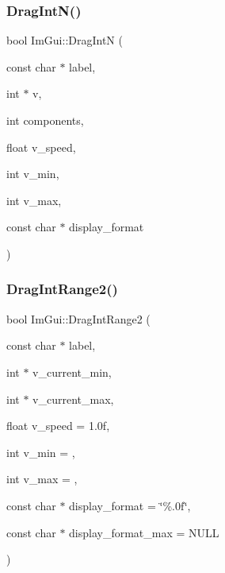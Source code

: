 \hypertarget{namespace_im_gui_a2854d672b818938e6e9fb1de6de3dbe7}{}\label{namespace_im_gui_a2854d672b818938e6e9fb1de6de3dbe7} 
\subsubsection{\texorpdfstring{Drag\+Int\+N()}{DragIntN()}}
{\footnotesize\ttfamily bool Im\+Gui\+::\+Drag\+IntN (\begin{DoxyParamCaption}\item[{const char $\ast$}]{label,  }\item[{int $\ast$}]{v,  }\item[{int}]{components,  }\item[{float}]{v\+\_\+speed,  }\item[{int}]{v\+\_\+min,  }\item[{int}]{v\+\_\+max,  }\item[{const char $\ast$}]{display\+\_\+format }\end{DoxyParamCaption})}

\hypertarget{namespace_im_gui_a6aaacf92126bf45ce0e58348b5297a43}{}\label{namespace_im_gui_a6aaacf92126bf45ce0e58348b5297a43} 
\subsubsection{\texorpdfstring{Drag\+Int\+Range2()}{DragIntRange2()}}
{\footnotesize\ttfamily bool Im\+Gui\+::\+Drag\+Int\+Range2 (\begin{DoxyParamCaption}\item[{const char $\ast$}]{label,  }\item[{int $\ast$}]{v\+\_\+current\+\_\+min,  }\item[{int $\ast$}]{v\+\_\+current\+\_\+max,  }\item[{float}]{v\+\_\+speed = {\ttfamily 1.0f},  }\item[{int}]{v\+\_\+min = {},  }\item[{int}]{v\+\_\+max = {},  }\item[{const char $\ast$}]{display\+\_\+format = {\ttfamily \char`\"{}\%.0f\char`\"{}},  }\item[{const char $\ast$}]{display\+\_\+format\+\_\+max = {\ttfamily NULL} }\end{DoxyParamCaption})}

